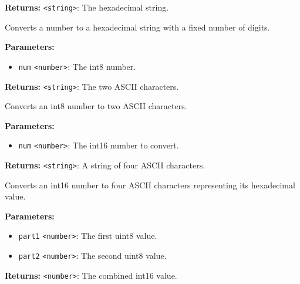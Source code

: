 \documentclass[12pt,a4paper]{article}
\begin{document}
\noindent \textbf{Returns:} \texttt{<string>}: The hexadecimal string.

\noindent Converts a number to a hexadecimal string with a fixed number of digits.

\vspace{5mm}
\noindent {}


\noindent \textbf{Parameters:}
\begin{itemize}
  \item \texttt{num} \texttt{<number>}: The int8 number.
\end{itemize}

\noindent \textbf{Returns:} \texttt{<string>}: The two ASCII characters.

\noindent Converts an int8 number to two ASCII characters.

\vspace{5mm}
\noindent {}


\noindent \textbf{Parameters:}
\begin{itemize}
  \item \texttt{num} \texttt{<number>}: The int16 number to convert.
\end{itemize}

\noindent \textbf{Returns:} \texttt{<string>}: A string of four ASCII characters.

\noindent Converts an int16 number to four ASCII characters representing its hexadecimal value.

\vspace{5mm}
\noindent {}


\noindent \textbf{Parameters:}
\begin{itemize}
  \item \texttt{part1} \texttt{<number>}: The first uint8 value.
  \item \texttt{part2} \texttt{<number>}: The second uint8 value.
\end{itemize}

\noindent \textbf{Returns:} \texttt{<number>}: The combined int16 value.
\end{document}

